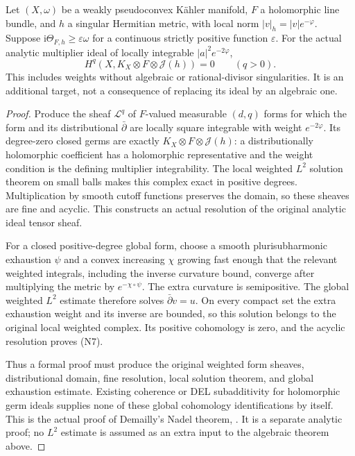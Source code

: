 \begin{theorem}
\label{thm:kn-nadel-analytic-arbitrary-weight}
\notready
Let $(X,\omega)$ be a weakly pseudoconvex K\"ahler manifold, $F$ a
holomorphic line bundle, and $h$ a singular Hermitian metric, with
local norm $|v|_h=|v|e^{-\varphi}$.  Suppose
$\mathrm i\Theta_{F,h}\geq\varepsilon\omega$ for a continuous
strictly positive function $\varepsilon$.  For the actual analytic
multiplier ideal of locally integrable $|a|^2e^{-2\varphi}$,
\[
 H^q(X,K_X\otimes F\otimes\mathcal J(h))=0\qquad(q>0).
 \tag{N7}
\]
This includes weights without algebraic or rational-divisor
singularities.  It is an additional target, not a consequence of
replacing its ideal by an algebraic one.
\end{theorem}
\begin{proof}
Produce the sheaf $\mathcal L^q$ of $F$-valued measurable $(d,q)$
forms for which the form and its distributional $\bar\partial$ are
locally square integrable with weight $e^{-2\varphi}$.
Its degree-zero closed germs are exactly
$K_X\otimes F\otimes\mathcal J(h)$: a distributionally holomorphic
coefficient has a holomorphic representative and the weight
condition is the defining multiplier integrability.  The local
weighted $L^2$ solution theorem on small balls makes this complex
exact in positive degrees.  Multiplication by smooth cutoff
functions preserves the domain, so these sheaves are fine and
acyclic.  This constructs an actual resolution of the original
analytic ideal tensor sheaf.

For a closed positive-degree global form, choose a smooth
plurisubharmonic exhaustion $\psi$ and a convex increasing
$\chi$ growing fast enough that the relevant weighted integrals,
including the inverse curvature bound, converge after multiplying
the metric by $e^{-\chi\circ\psi}$.  The extra curvature is
semipositive.  The global weighted $L^2$ estimate therefore solves
$\bar\partial v=u$.  On every compact set the extra exhaustion
weight and its inverse are bounded, so this solution belongs to
the original local weighted complex.  Its positive cohomology is
zero, and the acyclic resolution proves (N7).

Thus a formal proof must produce the original weighted form sheaves,
distributional domain, fine resolution, local solution theorem,
and global exhaustion estimate.  Existing coherence or DEL
subadditivity for holomorphic germ ideals supplies none of these
global cohomology identifications by itself.  This is the actual
proof of Demailly's Nadel theorem, \cite[Theorem~5.11]{DemAM}.
It is a separate analytic proof; no $L^2$ estimate is assumed
as an extra input to the algebraic theorem above.
\end{proof}

